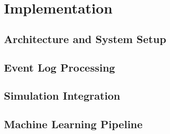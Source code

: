 \chapter{Implementation}
\label{chap:implementation}

\section{Architecture and System Setup}

\section{Event Log Processing}

\section{Simulation Integration}

\section{Machine Learning Pipeline}
